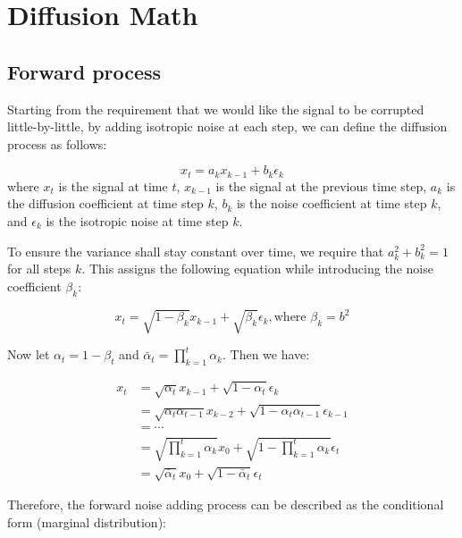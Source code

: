 \section*{Diffusion Math}

\subsection{Forward process}
Starting from the requirement that we would like the signal to be corrupted little-by-little, by adding isotropic noise at each step, we can define the diffusion process as follows:


\begin{equation}
    x_t = a_k x_{k-1} + b_k \epsilon_k
\end{equation}
where $x_t$ is the signal at time $t$, $x_{k-1}$ is the signal at the previous time step, $a_k$ is the diffusion coefficient at time step $k$, $b_k$ is the noise coefficient at time step $k$, and $\epsilon_k$ is the isotropic noise at time step $k$.

To ensure the variance shall stay constant over time, we require that $a_k^2 + b_k^2 = 1$ for all steps $k$. This assigns the following equation while introducing the noise coefficient $\beta_k$:

\begin{equation}
    x_t = \sqrt{1 - \beta_k} x_{k-1} + \sqrt{\beta_{k}} \epsilon_k, \text{where $\beta_k = b^2$}
    \label{eq:vp_sde}
\end{equation}

Now let $\alpha_{t} = 1 - \beta_t$ and $\bar{\alpha}_t = \prod_{k=1}^{t} \alpha_k$. Then we have:

\begin{equation}
    \begin{aligned}
        x_t &= \sqrt{\alpha_t} x_{k-1} + \sqrt{1 - \alpha_t} \epsilon_k\\
            &= \sqrt{\alpha_{t}\alpha_{t-1}} x_{k-2} + \sqrt{1 - \alpha_{t}\alpha_{t-1}} \epsilon_{k-1}\\
            &= \cdots\\
            &= \sqrt{\prod_{k=1}^{t} \alpha_k} x_0 + \sqrt{1 - \prod_{k=1}^{t} \alpha_k} \epsilon_t\\
            &= \sqrt{\bar{\alpha}_t} x_0 + \sqrt{1 - \bar{\alpha}_t} \epsilon_t
    \end{aligned}
\end{equation}

Therefore, the forward noise adding process can be described as the conditional form (marginal distribution):

